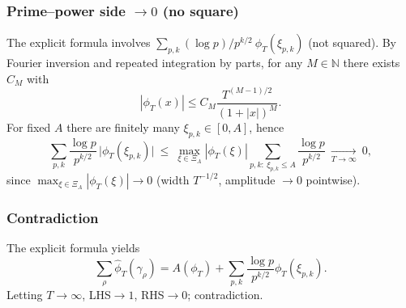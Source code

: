 \subsubsection{\texorpdfstring{Prime–power side $\to 0$ (no square)}{Prime–power side to 0 (no square)}}
The explicit formula involves $\sum_{p,k}(\log p)/p^{k/2}\ \phi_T(\xi_{p,k})$ (not squared).
By Fourier inversion and repeated integration by parts, for any $M\in\mathbb N$ there exists $C_M$ with
\[
|\phi_T(x)| \le C_M \frac{T^{(M-1)/2}}{(1+|x|)^M}.
\]
For fixed $A$ there are finitely many $\xi_{p,k}\in[0,A]$, hence
\[
\sum_{p,k}\frac{\log p}{p^{k/2}}\,\big|\phi_T(\xi_{p,k})\big|
\ \le\ \max_{\xi\in\Xi_A}|\phi_T(\xi)| \sum_{p,k:\ \xi_{p,k}\le A}\frac{\log p}{p^{k/2}}
\ \xrightarrow[T\to\infty]{}\ 0,
\]
since $\max_{\xi\in\Xi_A}|\phi_T(\xi)|\to 0$ (width $T^{-1/2}$, amplitude $\to 0$ pointwise).

\subsubsection{Contradiction}
The explicit formula yields
\[
\sum_{\rho}\hat\phi_T(\gamma_\rho)=A(\phi_T)+\sum_{p,k}\frac{\log p}{p^{k/2}}\phi_T(\xi_{p,k}).
\]
Letting $T\to\infty$, LHS$\to 1$, RHS$\to 0$; contradiction. \qedhere
